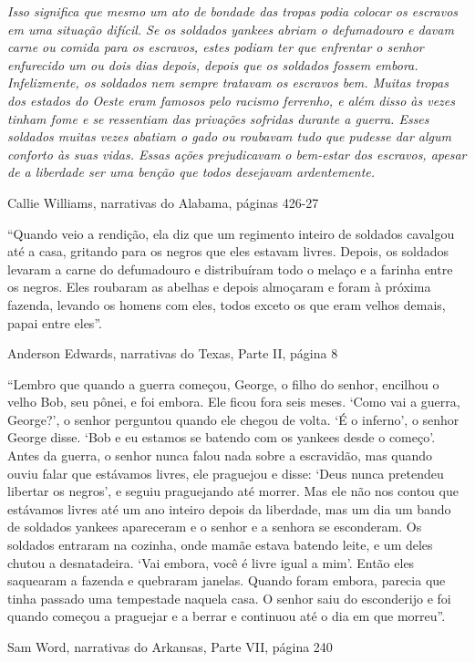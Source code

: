 \emph{Isso significa que mesmo um ato de bondade das tropas podia
colocar os escravos em uma situação difícil. Se os soldados yankees
abriam o defumadouro e davam carne ou comida para os escravos, estes
podiam ter que enfrentar o senhor enfurecido um ou dois dias depois,
depois que os soldados fossem embora. Infelizmente, os soldados nem
sempre tratavam os escravos bem. Muitas tropas dos estados do Oeste eram
famosos pelo racismo ferrenho, e além disso às vezes tinham fome e se
ressentiam das privações sofridas durante a guerra. Esses soldados
muitas vezes abatiam o gado ou roubavam tudo que pudesse dar algum
conforto às suas vidas. Essas ações prejudicavam o bem-estar dos
escravos, apesar de a liberdade ser uma benção que todos desejavam
ardentemente.}

Callie Williams, narrativas do Alabama, páginas 426-27

``Quando veio a rendição, ela diz que um regimento inteiro de soldados
cavalgou até a casa, gritando para os negros que eles estavam livres.
Depois, os soldados levaram a carne do defumadouro e distribuíram todo o
melaço e a farinha entre os negros. Eles roubaram as abelhas e depois
almoçaram e foram à próxima fazenda, levando os homens com eles, todos
exceto os que eram velhos demais, papai entre eles''.

Anderson Edwards, narrativas do Texas, Parte II, página 8

``Lembro que quando a guerra começou, George, o filho do senhor,
encilhou o velho Bob, seu pônei, e foi embora. Ele ficou fora seis
meses. `Como vai a guerra, George?', o senhor perguntou quando ele
chegou de volta. `É o inferno', o senhor George disse. `Bob e eu estamos
se batendo com os yankees desde o começo'. Antes da guerra, o senhor
nunca falou nada sobre a escravidão, mas quando ouviu falar que
estávamos livres, ele praguejou e disse: `Deus nunca pretendeu libertar
os negros', e seguiu praguejando até morrer. Mas ele não nos contou que
estávamos livres até um ano inteiro depois da liberdade, mas um dia um
bando de soldados yankees apareceram e o senhor e a senhora se
esconderam. Os soldados entraram na cozinha, onde mamãe estava batendo
leite, e um deles chutou a desnatadeira. `Vai embora, você é livre igual
a mim'. Então eles saquearam a fazenda e quebraram janelas. Quando foram
embora, parecia que tinha passado uma tempestade naquela casa. O senhor
saiu do esconderijo e foi quando começou a praguejar e a berrar e
continuou até o dia em que morreu''.

Sam Word, narrativas do Arkansas, Parte VII, página 240

